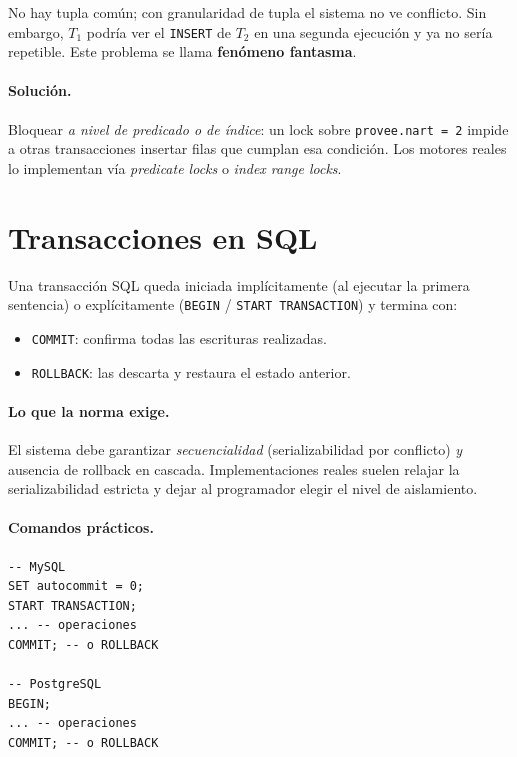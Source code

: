 \documentclass[11pt,a4paper]{article}
\begin{document}
No hay tupla común; con granularidad de tupla el sistema no ve conflicto.
Sin embargo, $T_1$ podría ver el \texttt{INSERT} de $T_2$ en una segunda
ejecución y ya no sería repetible. Este problema se llama
\textbf{fenómeno fantasma}.

\paragraph{Solución.} Bloquear \emph{a nivel de predicado o de índice}:
un lock sobre \texttt{provee.nart = 2} impide a otras transacciones
insertar filas que cumplan esa condición. Los motores reales lo
implementan vía \emph{predicate locks} o \emph{index range locks}.

\section{Transacciones en SQL}

Una transacción SQL queda iniciada implícitamente (al ejecutar la primera
sentencia) o explícitamente (\texttt{BEGIN} / \texttt{START TRANSACTION})
y termina con:

\begin{itemize}
    \item \texttt{COMMIT}: confirma todas las escrituras realizadas.
    \item \texttt{ROLLBACK}: las descarta y restaura el estado anterior.
\end{itemize}

\paragraph{Lo que la norma exige.} El sistema debe garantizar
\emph{secuencialidad} (serializabilidad por conflicto) \emph{y} ausencia
de rollback en cascada. Implementaciones reales suelen relajar la
serializabilidad estricta y dejar al programador elegir el nivel de
aislamiento.

\paragraph{Comandos prácticos.}
\begin{lstlisting}
-- MySQL
SET autocommit = 0;
START TRANSACTION;
... -- operaciones
COMMIT; -- o ROLLBACK

-- PostgreSQL
BEGIN;
... -- operaciones
COMMIT; -- o ROLLBACK
\end{lstlisting}
\end{document}
